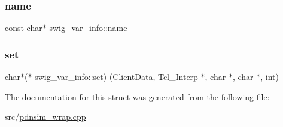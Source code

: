 \mbox{\label{structswig__var__info_a818f171973e6e1135a46b8b918c0b9eb}} 
\subsubsection{\texorpdfstring{name}{name}}
{\footnotesize\ttfamily const char$\ast$ swig\+\_\+var\+\_\+info\+::name}

\mbox{\label{structswig__var__info_a1c988d1806abe81050d325cc12524608}} 
\subsubsection{\texorpdfstring{set}{set}}
{\footnotesize\ttfamily char$\ast$($\ast$ swig\+\_\+var\+\_\+info\+::set) (Client\+Data, Tcl\+\_\+\+Interp $\ast$, char $\ast$, char $\ast$, int)}



The documentation for this struct was generated from the following file\+:\begin{DoxyCompactItemize}
\item 
src/\hyperlink{pdnsim__wrap_8cpp}{pdnsim\+\_\+wrap.\+cpp}\end{DoxyCompactItemize}
